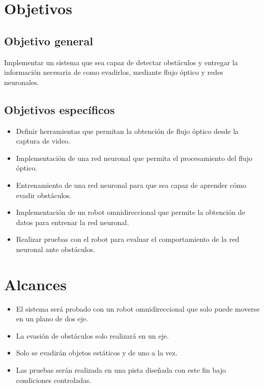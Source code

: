 \documentclass{iccmemoria}
\begin{document}
\section{Objetivos}

\subsection{Objetivo general}

Implementar un sistema que sea capaz de detectar obstáculos y entregar la información necesaria de como evadirlos, mediante flujo óptico y redes neuronales.

\subsection{Objetivos específicos}
 
\begin{itemize}
    \item Definir herramientas que permitan la obtención de flujo óptico desde la captura de video.
    \item Implementación de una red neuronal que permita el procesamiento del flujo óptico.
    \item Entrenamiento de una red neuronal para que sea capaz de aprender cómo evadir obstáculos.
    \item Implementación de un robot omnidireccional que permite la obtención de datos para entrenar la red neuronal.
    \item Realizar pruebas con el robot para evaluar el comportamiento de la red neuronal ante obstáculos.
\end{itemize}
 
\section{Alcances}
 
\begin{itemize}
    \item El sistema será probado con un robot omnidireccional que solo puede moverse en un plano de dos eje.
    \item La evasión de obstáculos solo realizará en un eje.
    \item Solo se evadirán objetos estáticos y de uno a la vez.
    \item Las pruebas serán realizada en una pista diseñada con este fin bajo condiciones controladas.
\end{itemize}
\end{document}
